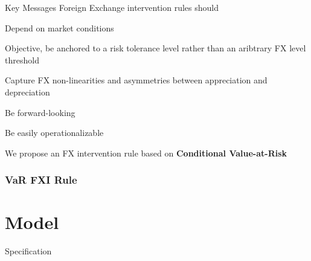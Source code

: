 \documentclass{beamer}
\newenvironment{largeitemize}{\itemize\addtolength{\itemsep}{10pt}}{\enditemize}
\begin{document}
\begin{frame}{Key Messages}
  Foreign Exchange intervention rules should\\
  \medskip
  
  \begin{largeitemize}
  \item Depend on market conditions
  \item Objective, be anchored to a risk tolerance level
    rather than an aribtrary FX level threshold
  \item Capture FX non-linearities and asymmetries between appreciation and
    depreciation
  \item Be forward-looking
  \item Be easily operationalizable\\
  \end{largeitemize}

\medskip  
We propose an FX intervention rule based on \textbf{Conditional Value-at-Risk}  
\end{frame}

\begin{frame}
  \frametitle{VaR FXI Rule}
\end{frame}


\section{Model}

\begin{frame}{Specification}

 \end{frame}
\end{document}
